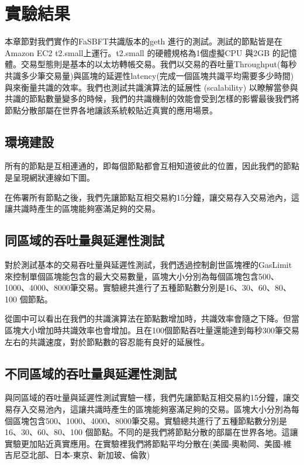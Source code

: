 \chapter{實驗結果} \label{se_6}
本章節對我們實作的FaSBFT共識版本的geth 進行的測試。測試的節點皆是在Amazon EC2 t2.small上運行。t2.small 的硬體規格為1個虛擬CPU 與2GB 的記憶體。交易型態則是基本的以太坊轉帳交易。我們以交易的吞吐量Throughput(每秒共識多少筆交易量)與區塊的延遲性latency(完成一個區塊共識平均需要多少時間)與來衡量共識的效率。我們也測試共識演算法的延展性 (scalability) 以瞭解當參與共識的節點數量變多的時候，我們的共識機制的效能會受到怎樣的影響最後我們將節點分散部屬在世界各地讓該系統較貼近真實的應用場景。
\section{環境建設}\label{se_6}
所有的節點是互相連通的，即每個節點都會互相知道彼此的位置，因此我們的節點是呈現網狀連線如下圖。


%


在佈署所有節點之後，我們先讓節點互相交易約15分鐘，讓交易存入交易池內，這讓共識時產生的區塊能夠塞滿足夠的交易。
\section{同區域的吞吐量與延遲性測試}\label{se_6}
對於測試基本的交易吞吐量與延遲性測試，我們透過控制創世區塊裡的GasLimit來控制單個區塊能包含的最大交易數量，區塊大小分別為每個區塊包含500、1000、4000、8000筆交易。實驗總共進行了五種節點數分別是16、30、60、80、100 個節點。
 
\newpage


從圖中可以看出在我們的共識演算法在節點數增加時，共識效率會隨之下降。但當區塊大小增加時共識效率也會增加。且在100個節點吞吐量還能達到每秒300筆交易左右的共識速度，對於節點數的容忍能有良好的延展性。



\section{不同區域的吞吐量與延遲性測試}\label{se_6}
與同區域的吞吐量與延遲性測試實驗一樣，我們先讓節點互相交易約15分鐘，讓交易存入交易池內，這讓共識時產生的區塊能夠塞滿足夠的交易。區塊大小分別為每個區塊包含500、1000、4000、8000筆交易。實驗總共進行了五種節點數分別是16、30、60、80、100 個節點。不同的是我們將節點分散的部屬在世界各地。這讓實驗更加貼近真實應用。在實驗裡我們將節點平均分散在(美國-奧勒岡、美國-維吉尼亞北部、日本-東京、新加玻、倫敦)



%